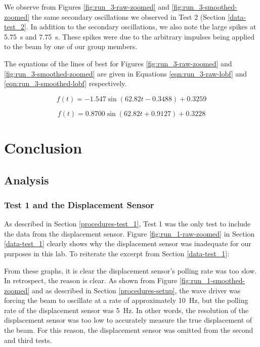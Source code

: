 \documentclass[12 pt]{report}
\begin{document}
We observe from Figures \ref{fig:run_3-raw-zoomed} and \ref{fig:run_3-smoothed-zoomed} the same secondary oscillations we observed in Test \num{2} (Section \ref{data-test_2}. In addition to the secondary oscillations, we also note the large spikes at \qty{5.75}{\s} and \qty{7.75}{\s}. These spikes were due to the arbitrary impulses being applied to the beam by one of our group members.

The equations of the lines of best for Figures \ref{fig:run_3-raw-zoomed} and \ref{fig:run_3-smoothed-zoomed} are given in Equations \ref{eqn:run_3-raw-lobf} and \ref{eqn:run_3-smoothed-lobf} respectively.

\begin{equation} \label{eqn:run_3-raw-lobf}
f(t)=-1.547\sin(62.82t-0.3488)+0.3259
\end{equation}

\begin{equation} \label{eqn:run_3-smoothed-lobf}
f(t)=0.8700\sin(62.82t+0.9127)+0.3228
\end{equation}

\chapter{Conclusion} \label{conclusion-chapter}
\section{Analysis} \label{analysis}
\subsection{Test 1 and the Displacement Sensor} \label{analysis-test_1_and_the_displacement_sensor}
As described in Section \ref{procedures-test_1}, Test \num{1} was the only test to include the data from the displacement sensor. Figure \ref{fig:run_1-raw-zoomed} in Section \ref{data-test_1} clearly shows why the displacement sensor was inadequate for our purposes in this lab. To reiterate the excerpt from Section \ref{data-test_1}:

\begin{displayquote}
From these graphs, it is clear the displacement sensor's polling rate was too slow. In retrospect, the reason is clear. As shown from Figure \ref{fig:run_1-smoothed-zoomed} and as described in Section \ref{procedures-setup}, the wave driver was forcing the beam to oscillate at a rate of approximately \qty{10}{\hertz}, but the polling rate of the displacement sensor was \qty{5}{\hertz}. In other words, the resolution of the displacement sensor was too low to accurately measure the true displacement of the beam. For this reason, the displacement sensor was omitted from the second and third tests.
\end{displayquote}
\end{document}
